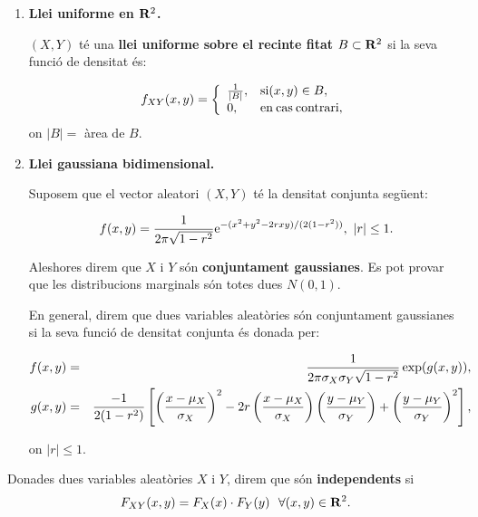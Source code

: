 \begin{enumerate}

\item {\bf Llei uniforme en ${\bf R}^2$.}

$(X,Y)$ t\'e una {\bf llei uniforme sobre el recinte fitat $B \subset
{\bf R}^2$}
si la
seva funci\'o de densitat \'es:

$$f_{XY}(x,y) = \left\{ \begin{array}{ll} {1 \over |B|}, & {\rm si } (x,y) 
\in B,\\ 0, & {\rm en \> cas \> contrari}, \end{array} \right.$$
on $|B| =$ \`area de $B$.

\item {\bf Llei gaussiana bidimensional.}

Suposem que el vector aleatori $(X,Y)$ t\'e la densitat conjunta seg\"uent:

$$f(x,y) = {1 \over 2 \pi \sqrt{1 - r^2}} {\rm e}^{-(x^2+y^2-2rxy)/(2(1-r^2))}, \ |r|
\leq 1.$$

Aleshores direm que $X$ i $Y$ s\'on {\bf conjuntament gaussianes}.
 Es pot
provar que les distribucions marginals s\'on totes dues $N(0,1)$.

En general, direm que dues variables aleat\`ories s\'on conjuntament gaussianes
si la
seva funci\'o de densitat conjunta \'es donada per:

\begin{eqnarray*}
f(x,y)& = & {1 \over 2 \pi \sigma_X \sigma_Y \sqrt{1 - r^2}} \exp (g(x,y)), \\
g(x,y) & = & {{-1 \over
2(1-r^2)} \left[\left( {x-\mu_X \over \sigma_X} \right)^2 - 2 r \left( {x-\mu_X
\over \sigma_X} \right) \left( {y-\mu_Y \over \sigma_Y} \right) + \left( {y-\mu_Y
\over \sigma_Y} \right)^2 \right],}
\end{eqnarray*}

on $|r| \leq 1$.

\end{enumerate}

\begin{defin}
Donades dues variables aleat\`ories $X$ i $Y$, direm que s\'on {\bf
independents} si
$$F_{XY}(x,y) = F_X(x) \cdot F_Y(y) \ \ \forall (x,y) \in {\bf R}^2.$$
\end{defin}

